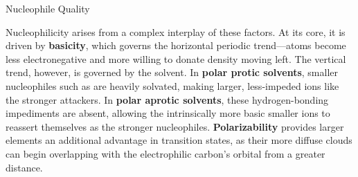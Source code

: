 \documentclass[10pt]{article}
\begin{document}
\begin{core}[label=core:nuc_quality]{Nucleophile Quality}
\begin{enumerate}
      \end{enumerate}

      Nucleophilicity arises from a complex interplay of these factors. At its core, it is driven by \textbf{basicity}, which governs the horizontal periodic trend---atoms become less electronegative and more willing to donate  density moving left. The vertical trend, however, is governed by the solvent. In \textbf{polar protic solvents}, smaller nucleophiles such as  are heavily solvated, making larger, less-impeded ions like  the stronger attackers. In \textbf{polar aprotic solvents}, these hydrogen-bonding impediments are absent, allowing the intrinsically more basic smaller ions to reassert themselves as the stronger nucleophiles. \textbf{Polarizability} provides larger elements an additional advantage in \snt transition states, as their more diffuse  clouds can begin overlapping with the electrophilic carbon's orbital from a greater distance.


    \end{core}
\end{document}
